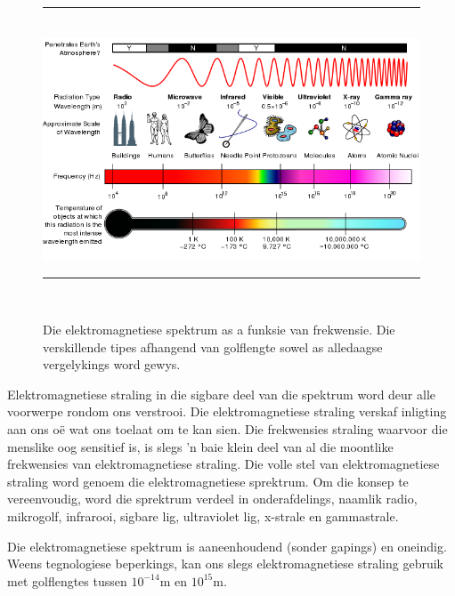 \begin{figure}[H] %
\begin{center}
\rule[.1in]{\figurerulewidth}{.005in} \\
\includegraphics[width=\columnwidth]{col11305.imgs/m38778_EM_Spectrum_Properties_edit.png} %
\caption{Die elektromagnetiese spektrum as a funksie van frekwensie. Die verskillende tipes afhangend van golflengte  sowel as alledaagse vergelykings word gewys.}
\label{fig:emspectrum}
\rule[.1in]{\figurerulewidth}{.005in} \\
\end{center}
\end{figure}       


\label{m38778*id187230}E\-lek\-tro\-mag\-ne\-tie\-se straling in die sigbare deel van die spektrum word deur alle voorwerpe rondom ons verstrooi. Die elektromagnetiese straling verskaf inligting aan ons o\"e wat ons toelaat om te kan sien. Die frekwensies straling waarvoor die menslike oog sensitief is, is slegs 'n baie klein deel van al die moontlike frekwensies van e\-lek\-tro\-mag\-ne\-tie\-se straling. Die volle stel van e\-lek\-tro\-mag\-ne\-tie\-se straling word genoem die elektromagnetiese sprektrum. Om die konsep te vereenvoudig, word die sprektrum verdeel in onderafdelings, naamlik radio, mikrogolf, infrarooi, sigbare lig, ultraviolet lig, x-strale en gammastrale. \par
 
\label{m38778*eip-855}Die e\-lek\-tro\-mag\-ne\-tie\-se spektrum is aaneenhoudend (sonder gapings) en oneindig. Weens tegnologiese beperkings, kan ons slegs elektromagnetiese straling gebruik met golflengtes tussen ${10}^{-14}\text{m}$ en ${10}^{15}\text{m}$.
           

